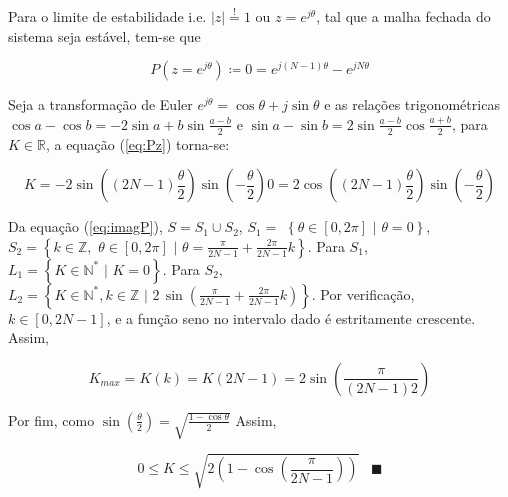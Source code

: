 \documentclass[twoside, fleqn]{article}
\begin{document}
    Para o limite de estabilidade i.e. $|z| \stackrel{!}{=} 1$ ou $z = e^{j \theta}$, tal que a malha fechada do sistema seja estável, tem-se que
    
        \begin{equation}
            P(z = e^{j \theta}) \coloneqq 0 = e^{j (N-1) \theta} - e^{j N \theta}
            \label{eq:Pz}
        \end{equation}
    
    Seja a transformação de Euler $e^{j \theta} = \cos{\theta} + j \sin{\theta}$ e as relações trigonométricas $\cos{a} - \cos{b} = -2 \sin{a+b} \sin{\frac{a-b}{2}}$ e $\sin{a} - \sin{b} = 2 \sin{\frac{a-b}{2}} \cos{\frac{a+b}{2}}$, para $K \in \mathbb{R}$, a equação (\ref{eq:Pz}) torna-se:
    
        \begin{subequations}
            \begin{equation}
                K = -2 \sin\left((2N - 1) \frac{\theta}{2}\right) \sin\left(- \frac{\theta}{2}\right)
            \end{equation}
            \begin{equation}
                0 =  2 \cos\left((2N - 1) \frac{\theta}{2}\right) \sin\left(-\frac{\theta}{2}\right)
            \label{eq:imagP}
            \end{equation}
        \end{subequations}
    
    Da equação (\ref{eq:imagP}), $S = S_1 \cup S_2$, $S_1 = $ $ \left\{\theta \in [0, 2 \pi] \,\, \Bigr| \,\, \theta = 0\right\}$, $S_2 = \left\{k \in \mathbb{Z}, \,\, \theta \in [0, 2 \pi] \,\, \Bigr| \,\, \theta = \frac{\pi}{2N - 1} + \frac{2 \pi}{2N - 1} k\right\}$. Para $S_1$, $L_1 = \left\{K \in \mathbb{N}^* \,\, \Bigr| \,\, K = 0\right\}$. Para $S_2$, $L_2 = \left\{K \in \mathbb{N}^*, k \in \mathbb{Z} \,\, \Bigr| \,\, 2 \, \sin\left(\frac{\pi}{2N-1} + \frac{2 \pi}{2N-1} k\right)\right\}$. Por verificação, $k \in [0, 2N -1]$, e a função seno no intervalo dado é estritamente crescente. Assim, 
    
        \begin{equation}
            K_{max} = K(k) = K(2N - 1) = 2 \sin\left(\frac{\pi}{(2N - 1) 2}\right)
        \end{equation}
    
    Por fim, como $\sin(\frac{\theta}{2}) = \sqrt{\frac{1 - \cos{\theta}}{2}}$ Assim,
    
        \begin{equation}
            0 \leq K \leq \sqrt{2 \left(1 - \cos\left(\frac{\pi}{2N - 1}\right)\right)} \hspace{10pt} \blacksquare
        \end{equation}
\end{document}
